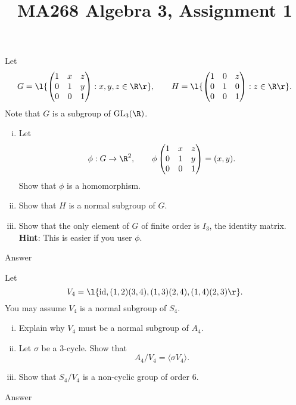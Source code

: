 \documentclass[a4paper]{article}
\title{MA268 Algebra 3, Assignment 1}
\begin{document}
\maketitle

\setlength{\parindent}{0em}
\setlength{\parskip}{1em}



\begin{questionbody}
Let \[
    G = \l\{ \begin{pmatrix}
        1 & x & z \\
        0 & 1 & y \\
        0 & 0 & 1
    \end{pmatrix} : x, y, z \in \R \r\}, \qquad
    H = \l\{ \begin{pmatrix}
        1 & 0 & z \\
        0 & 1 & 0 \\
        0 & 0 & 1
    \end{pmatrix} : z \in \R \r\}.
\] Note that $G$ is a subgroup of $\mathrm{GL}_3(\R)$.
%
\begin{enumerate}[(i)]
\item Let \[
    \phi : G \to \R^2, \qquad \phi \begin{pmatrix}
        1 & x & z \\
        0 & 1 & y \\
        0 & 0 & 1
    \end{pmatrix} = (x, y).
\] Show that $\phi$ is a homomorphism.

\item Show that $H$ is a normal subgroup of $G$.

\item Show that the only element of $G$ of finite order is $I_3$, the identity matrix. \textbf{Hint}: This is easier if you user $\phi$.
\end{enumerate}
\end{questionbody}

Answer



\begin{questionbody}
Let \[
V_4 = \l\{ \mathrm{id}, (1,2)(3,4), (1,3)(2,4), (1,4)(2,3) \r\}.
\] You may assume $V_4$ is a normal subgroup of $S_4$.
%
\begin{enumerate}[(i)]
\item Explain why $V_4$ must be a normal subgroup of $A_4$.

\item Let $\sigma$ be a 3-cycle. Show that \[ A_4 / V_4 = \langle \sigma V_4 \rangle . \]

\item Show that $S_4 / V_4$ is a non-cyclic group of order 6.
\end{enumerate}
\end{questionbody}

Answer

\end{document}
